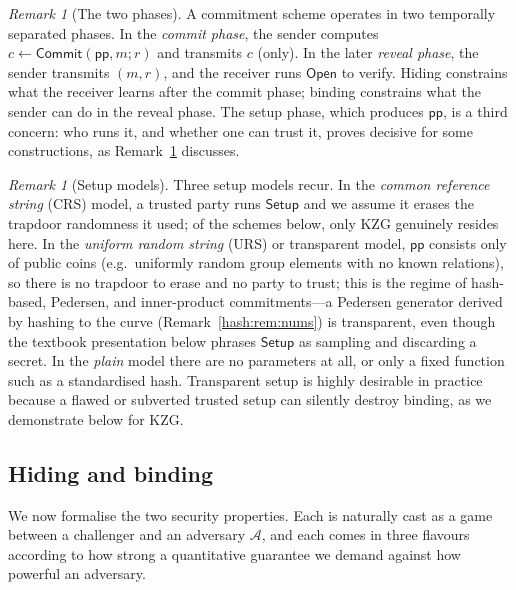 \documentclass[11pt,a4paper]{article}
\theoremstyle{definition}
\theoremstyle{remark}
\newtheorem{remark}[theorem]{Remark}
\begin{document}
\begin{remark}[The two phases]\label{commitments:rem:phases}
A commitment scheme operates in two temporally separated phases. In the \emph{commit phase}, the sender computes \(c \gets \mathsf{Commit}(\mathsf{pp}, m; r)\) and transmits \(c\) (only). In the later \emph{reveal phase}, the sender transmits \((m, r)\), and the receiver runs \(\mathsf{Open}\) to verify. Hiding constrains what the receiver learns after the commit phase; binding constrains what the sender can do in the reveal phase. The setup phase, which produces \(\mathsf{pp}\), is a third concern: who runs it, and whether one can trust it, proves decisive for some constructions, as Remark~\ref{commitments:rem:setup-trust} discusses.
\end{remark}

\begin{remark}[Setup models]\label{commitments:rem:setup-trust}
Three setup models recur. In the \emph{common reference string} (CRS) model, a trusted party runs \(\mathsf{Setup}\) and we assume it erases the trapdoor randomness it used; of the schemes below, only KZG genuinely resides here. In the \emph{uniform random string} (URS) or transparent model, \(\mathsf{pp}\) consists only of public coins (e.g.\ uniformly random group elements with no known relations), so there is no trapdoor to erase and no party to trust; this is the regime of hash-based, Pedersen, and inner-product commitments---a Pedersen generator derived by hashing to the curve (Remark~\ref{hash:rem:nums}) is transparent, even though the textbook presentation below phrases \(\mathsf{Setup}\) as sampling and discarding a secret. In the \emph{plain} model there are no parameters at all, or only a fixed function such as a standardised hash. Transparent setup is highly desirable in practice because a flawed or subverted trusted setup can silently destroy binding, as we demonstrate below for KZG.
\end{remark}

\subsection{Hiding and binding}\label{commitments:subsec:properties}

We now formalise the two security properties. Each is naturally cast as a game between a challenger and an adversary \(\mathcal{A}\), and each comes in three flavours according to how strong a quantitative guarantee we demand against how powerful an adversary.
\end{document}
